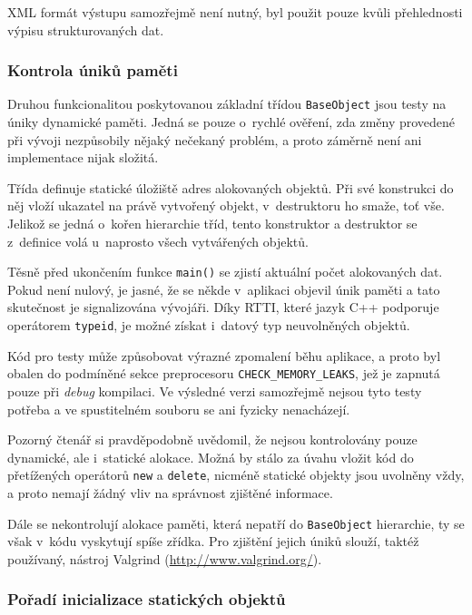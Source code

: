 \documentclass[11pt,twoside,a4paper]{book}
\begin{document}
XML formát výstupu samozřejmě není nutný, byl použit pouze kvůli přehlednosti výpisu strukturovaných dat.


\subsubsection{Kontrola úniků paměti}
\label{kontrola_uniku_pameti}

Druhou funkcionalitou poskytovanou základní třídou \texttt{BaseObject} jsou testy na úniky dynamické paměti. Jedná se pouze o~rychlé ověření, zda změny provedené při vývoji nezpůsobily nějaký nečekaný problém, a proto záměrně není ani implementace nijak složitá.

Třída definuje statické úložiště adres alokovaných objektů. Při své konstrukci do něj vloží ukazatel na právě vytvořený objekt, v~destruktoru ho smaže, toť vše. Jelikož se jedná o~kořen hierarchie tříd, tento konstruktor a destruktor se z~definice volá u~naprosto všech vytvářených objektů.

Těsně před ukončením funkce \texttt{main()} se zjistí aktuální počet alokovaných dat. Pokud není nulový, je jasné, že se někde v~aplikaci objevil únik paměti a tato skutečnost je signalizována vývojáři. Díky RTTI, které jazyk C++ podporuje operátorem \texttt{typeid}, je možné získat i~datový typ neuvolněných objektů.

Kód pro testy může způsobovat výrazné zpomalení běhu aplikace, a proto byl obalen do podmíněné sekce preprocesoru \texttt{CHECK\_MEMORY\_LEAKS}, jež je zapnutá pouze při \textit{debug} kompilaci. Ve výsledné verzi samozřejmě nejsou tyto testy potřeba a ve spustitelném souboru se ani fyzicky nenacházejí.

Pozorný čtenář si pravděpodobně uvědomil, že nejsou kontrolovány pouze dynamické, ale i~statické alokace. Možná by stálo za úvahu vložit kód do přetížených operátorů \texttt{new} a \texttt{delete}, nicméně statické objekty jsou uvolněny vždy, a proto nemají žádný vliv na správnost zjištěné informace.

Dále se nekontrolují alokace paměti, která nepatří do \texttt{BaseObject} hierarchie, ty se však v~kódu vyskytují spíše zřídka. Pro zjištění jejich úniků slouží, taktéž používaný, nástroj Valgrind (\url{http://www.valgrind.org/}).


\subsubsection{Pořadí inicializace statických objektů}
\end{document}
